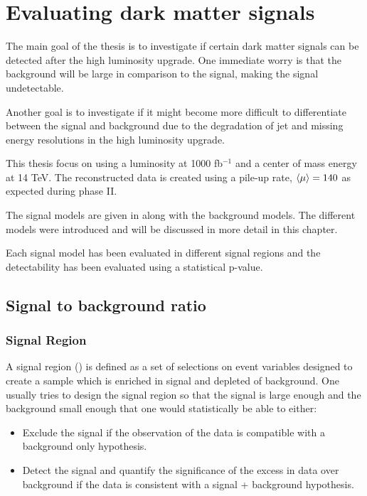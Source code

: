 \chapter{Evaluating dark matter signals}\label{cha:darkmatter}

The main goal of the thesis is to investigate if certain dark matter signals can be detected after the high luminosity upgrade. One immediate worry is that the background will be large in comparison to the signal, making the signal undetectable.

Another goal is to investigate if it might become more difficult to differentiate between the signal and background due to the degradation of jet and missing energy resolutions in the high luminosity upgrade.

This thesis focus on using a luminosity at 1000 fb$^{-1}$ and a center of mass energy at 14 TeV. The reconstructed data is created using a pile-up rate, $\left<\mu\right> = 140$ as expected during phase II.

The signal models are given in  along with the background models. The different models were introduced  and will be discussed in more detail in this chapter.

Each signal model has been evaluated in different signal regions and the detectability has been evaluated using a statistical p-value. 

\newpage
\section{Signal to background ratio}
\subsection{Signal Region}
A signal region (\abbrSR) is defined as a set of selections on event variables designed to create a sample which is enriched in signal and depleted of background. One usually tries to design the signal region so that the signal is large enough and the background small enough that one would statistically be able to either:
\begin{itemize}
\item Exclude the signal if the observation of the data is compatible with a background only hypothesis.
\item Detect the signal and quantify the significance of the excess in data over background if the data is consistent with a signal + background hypothesis.
\end{itemize}

